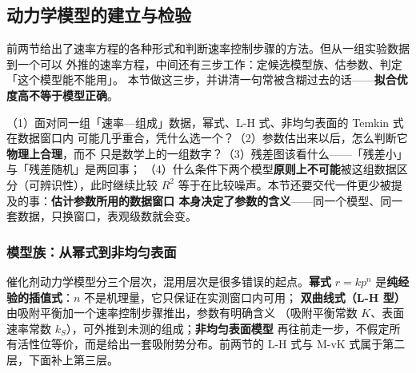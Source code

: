 
\subsection{动力学模型的建立与检验}
\label{sec:ch10-model}

前两节给出了速率方程的各种形式和判断速率控制步骤的方法。但从一组实验数据到一个可以
外推的速率方程，中间还有三步工作：定候选模型族、估参数、判定「这个模型能不能用」。
本节做这三步，并讲清一句常被含糊过去的话——\textbf{拟合优度高不等于模型正确}。

\begin{probout}
（1）面对同一组「速率—组成」数据，幂式、L-H 式、非均匀表面的 Temkin 式在数据窗口内
可能几乎重合，凭什么选一个？（2）参数估出来以后，怎么判断它\textbf{物理上合理}，而不
只是数学上的一组数字？（3）残差图该看什么——「残差小」与「残差随机」是两回事；
（4）什么条件下两个模型\textbf{原则上不可能}被这组数据区分（可辨识性），此时继续比较
$R^2$ 等于在比较噪声。本节还要交代一件更少被提及的事：\textbf{估计参数所用的数据窗口
本身决定了参数的含义}——同一个模型、同一套数据，只换窗口，表观级数就会变。
\end{probout}

\subsubsection{模型族：从幂式到非均匀表面}

催化剂动力学模型分三个层次，混用层次是很多错误的起点。\textbf{幂式}
$r=kp^n$ 是\textbf{纯经验的插值式}：$n$ 不是机理量，它只保证在实测窗口内可用；
\textbf{双曲线式（L-H 型）}由吸附平衡加一个速率控制步骤推出，参数有明确含义
（吸附平衡常数 $K$、表面速率常数 $k_S$），可外推到未测的组成；\textbf{非均匀表面模型}
再往前走一步，不假定所有活性位等价，而是给出一套吸附势分布。前两节的 L-H 式与
M-vK 式属于第二层，下面补上第三层。

